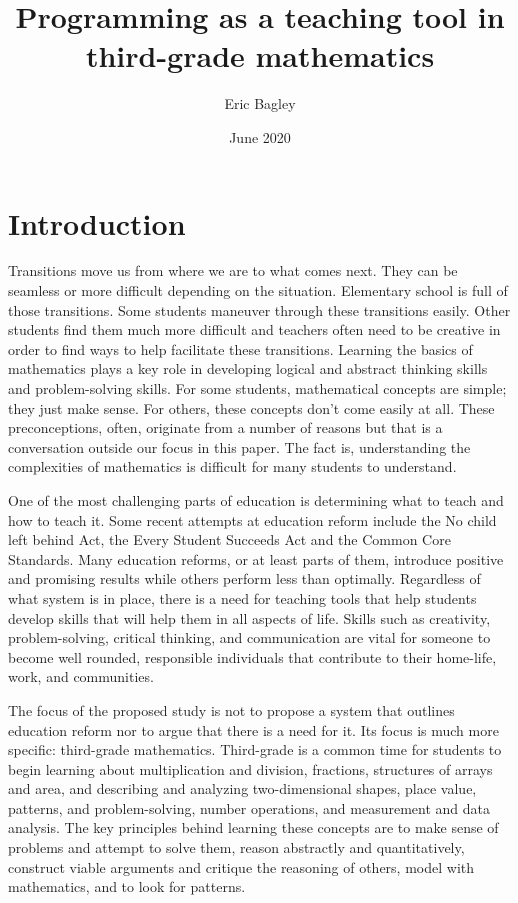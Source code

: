 \documentclass[12pt]{extarticle}
\title{Programming as a teaching tool in third-grade mathematics }
\author{Eric Bagley}
\date{June 2020}
\begin{document}
\maketitle

\section*{Introduction}
Transitions move us from where we are to what comes next. They can be seamless or more difficult depending on the situation. Elementary school is full of those transitions. Some students maneuver through these transitions easily. Other students find them much more difficult and teachers often need to be creative in order to find ways to help facilitate these transitions. Learning the basics of mathematics plays a key role in developing logical and abstract thinking skills and problem-solving skills. For some students, mathematical concepts are simple; they just make sense. For others, these concepts don’t come easily at all. These preconceptions, often, originate from a number of reasons but that is a conversation outside our focus in this paper. The fact is, understanding the complexities of mathematics is difficult for many students to understand.

One of the most challenging parts of education is determining what to teach and how to teach it. Some recent attempts at education reform include the No child left behind Act,  the Every Student Succeeds Act and the Common Core Standards. Many education reforms, or at least parts of them, introduce positive and promising results while others perform less than optimally. Regardless of what system is in place, there is a need for teaching tools that help students develop skills that will help them in all aspects of life. Skills such as creativity, problem-solving, critical thinking, and communication are vital for someone to become well rounded, responsible individuals that contribute to their home-life, work, and communities.

The focus of the proposed study is not to propose a system that outlines education reform nor to argue that there is a need for it. Its focus is much more specific: third-grade mathematics. Third-grade is a common time for students to begin learning about multiplication and division, fractions, structures of arrays and area, and describing and analyzing two-dimensional shapes, place value, patterns, and problem-solving, number operations, and measurement and data analysis. The key principles behind learning these concepts are to make sense of problems and attempt to solve them, reason abstractly and quantitatively, construct viable arguments and critique the reasoning of others, model with mathematics, and to look for patterns.
\end{document}
